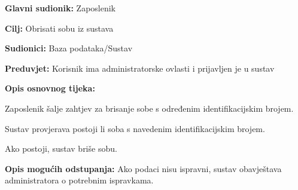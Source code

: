                 \noindent {}
					\begin{packed_item}
	
						\item \textbf{Glavni sudionik: }Zaposlenik
						\item  \textbf{Cilj:} Obrisati sobu iz sustava
						\item  \textbf{Sudionici:} Baza podataka/Sustav
						\item  \textbf{Preduvjet:} Korisnik ima administratorske ovlasti i prijavljen je u sustav
						\item  \textbf{Opis osnovnog tijeka:}
						
						\item[] \begin{packed_enum}
	
							\item Zaposlenik šalje zahtjev za brisanje sobe s određenim identifikacijskim brojem.
							\item Sustav provjerava postoji li soba s navedenim identifikacijskim brojem.
                            \item Ako postoji, sustav briše sobu.
	
						\end{packed_enum}
						
						\item  \textbf{Opis mogućih odstupanja:} Ako podaci nisu ispravni, sustav obavještava administratora o potrebnim ispravkama.
						
						
					\end{packed_item}

